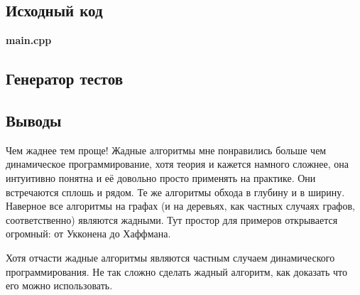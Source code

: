 \documentclass[12pt]{article}
\newcommand{\print}[1]{{\large \textbf{#1}} 
{\scriptsize }}
\begin{document}
\subsection*{Исходный код}


\print{main.cpp}

\subsection*{Генератор тестов}


\subsection*{Выводы}

Чем жаднее тем проще! Жадные алгоритмы мне понравились больше чем динамическое программирование, хотя теория и кажется намного сложнее, она интуитивно понятна и её довольно просто применять на практике. Они встречаются сплошь и рядом. Те же алгоритмы обхода в глубину и в ширину. Наверное все алгоритмы на графах (и на деревьях, как частных случаях графов, соответственно) являются жадными. Тут простор для примеров открывается огромный: от Укконена до Хаффмана.

Хотя отчасти жадные алгоритмы являются частным случаем динамического программирования. Не так сложно сделать жадный алгоритм, как доказать что его можно использовать.
\end{document}
